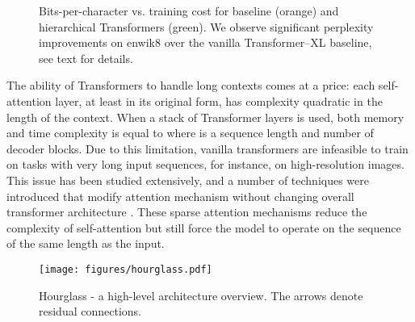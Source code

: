 \documentclass[11pt]{article}
\begin{document}
\begin{figure}[ht!]
\centering
\centering
\caption{Bits-per-character vs.
training cost for baseline (orange) and hierarchical Transformers (green).
We observe significant perplexity improvements on enwik8 over the vanilla Transformer–XL baseline, see text for details.
}
\label{fig:linear}
\end{figure}

The ability of Transformers to handle long contexts comes at a price:
each self-attention layer, at least in its original form, has complexity quadratic in the length of the context. When a stack of  Transformer layers is used, both memory and time complexity is equal to  where  is a sequence length and  number of decoder blocks. Due to this limitation, vanilla transformers are infeasible to train on tasks with very long input sequences, for instance, on high-resolution images.
This issue has been studied extensively, and a number of techniques were introduced that modify attention mechanism without changing overall transformer architecture \cite{child2019generating,roy2020efficient,ren2021combiner}. These sparse attention mechanisms reduce the complexity of self-attention but still force the model to operate on the sequence of the same length as the input.

\begin{figure*}[t]
  \centering
  \texttt{[image: figures/hourglass.pdf]}
  \caption{Hourglass - a high-level architecture overview. The arrows denote residual connections.}
  \label{fig:model}
\end{figure*}
\end{document}
